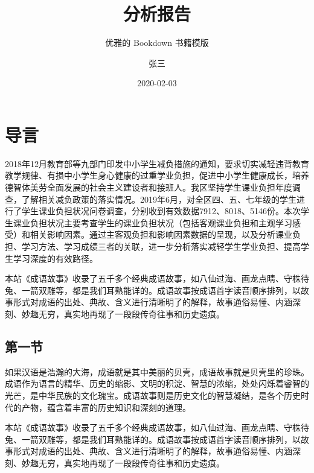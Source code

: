 \documentclass[hyperref, a4paper, UTF8, zihao = -4, linespread = 1]{ctexbook}
\title{分析报告}
\subtitle{优雅的 Bookdown 书籍模版}
\author{张三}
\date{2020-02-03}
\begin{document}
\maketitle


\thispagestyle{empty}

\begin{center}

\end{center}

\setlength{\abovedisplayskip}{-5pt}
\setlength{\abovedisplayshortskip}{-5pt}

{
\setcounter{tocdepth}{2}
\tableofcontents
}
\mainmatter

\hypertarget{intro}{%
\chapter{导言}\label{intro}}

2018年12月教育部等九部门印发中小学生减负措施的通知，要求切实减轻违背教育教学规律、有损中小学生身心健康的过重学业负担，促进中小学生健康成长，培养德智体美劳全面发展的社会主义建设者和接班人。我区坚持学生课业负担年度调查，了解相关减负政策的落实情况。2019年6月，对全区四、五、七年级的学生进行了学生课业负担状况问卷调查，分别收到有效数据7912、8018、5146份。本次学生课业负担状况主要考查学生的课业负担状况（包括客观课业负担和主观学习感受）和相关影响因素。通过主客观负担和影响因素数据的呈现，以及分析课业负担、学习方法、学习成绩三者的关联，进一步分析落实减轻学生学业负担、提高学生学习深度的有效路径。

本站《成语故事》收录了五千多个经典成语故事，如八仙过海、画龙点睛、守株待兔、一箭双雕等，都是我们耳熟能详的。成语故事按成语首字读音顺序排列，以故事形式对成语的出处、典故、含义进行清晰明了的解释，故事通俗易懂、内涵深刻、妙趣无穷，真实地再现了一段段传奇往事和历史遗痕。

\hypertarget{ux7b2cux4e00ux8282}{%
\section{第一节}\label{ux7b2cux4e00ux8282}}

如果汉语是浩瀚的大海，成语就是其中美丽的贝壳，成语故事就是贝壳里的珍珠。成语作为语言的精华、历史的缩影、文明的积淀、智慧的浓缩，处处闪烁着睿智的光芒，是中华民族的文化瑰宝。成语故事则是历史文化的智慧凝结，是各个历史时代的产物，蕴含着丰富的历史知识和深刻的道理。

本站《成语故事》收录了五千多个经典成语故事，如八仙过海、画龙点睛、守株待兔、一箭双雕等，都是我们耳熟能详的。成语故事按成语首字读音顺序排列，以故事形式对成语的出处、典故、含义进行清晰明了的解释，故事通俗易懂、内涵深刻、妙趣无穷，真实地再现了一段段传奇往事和历史遗痕。
\end{document}
